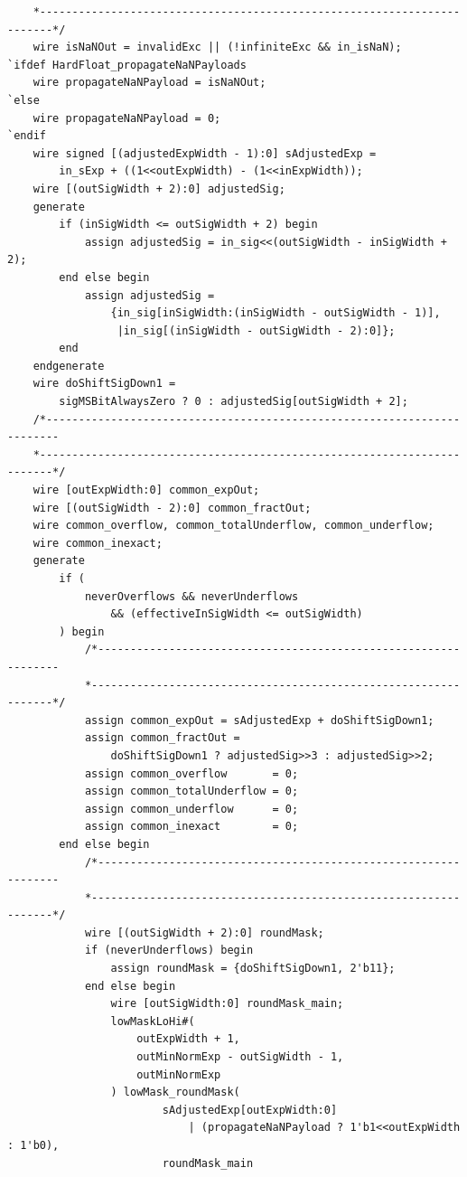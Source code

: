 \documentclass[12pt,letter]{article}
\begin{document}
\begin{lstlisting}
    *------------------------------------------------------------------------*/
    wire isNaNOut = invalidExc || (!infiniteExc && in_isNaN);
`ifdef HardFloat_propagateNaNPayloads
    wire propagateNaNPayload = isNaNOut;
`else
    wire propagateNaNPayload = 0;
`endif
    wire signed [(adjustedExpWidth - 1):0] sAdjustedExp =
        in_sExp + ((1<<outExpWidth) - (1<<inExpWidth));
    wire [(outSigWidth + 2):0] adjustedSig;
    generate
        if (inSigWidth <= outSigWidth + 2) begin
            assign adjustedSig = in_sig<<(outSigWidth - inSigWidth + 2);
        end else begin
            assign adjustedSig =
                {in_sig[inSigWidth:(inSigWidth - outSigWidth - 1)],
                 |in_sig[(inSigWidth - outSigWidth - 2):0]};
        end
    endgenerate
    wire doShiftSigDown1 =
        sigMSBitAlwaysZero ? 0 : adjustedSig[outSigWidth + 2];
    /*------------------------------------------------------------------------
    *------------------------------------------------------------------------*/
    wire [outExpWidth:0] common_expOut;
    wire [(outSigWidth - 2):0] common_fractOut;
    wire common_overflow, common_totalUnderflow, common_underflow;
    wire common_inexact;
    generate
        if (
            neverOverflows && neverUnderflows
                && (effectiveInSigWidth <= outSigWidth)
        ) begin
            /*----------------------------------------------------------------
            *----------------------------------------------------------------*/
            assign common_expOut = sAdjustedExp + doShiftSigDown1;
            assign common_fractOut =
                doShiftSigDown1 ? adjustedSig>>3 : adjustedSig>>2;
            assign common_overflow       = 0;
            assign common_totalUnderflow = 0;
            assign common_underflow      = 0;
            assign common_inexact        = 0;
        end else begin
            /*----------------------------------------------------------------
            *----------------------------------------------------------------*/
            wire [(outSigWidth + 2):0] roundMask;
            if (neverUnderflows) begin
                assign roundMask = {doShiftSigDown1, 2'b11};
            end else begin
                wire [outSigWidth:0] roundMask_main;
                lowMaskLoHi#(
                    outExpWidth + 1,
                    outMinNormExp - outSigWidth - 1,
                    outMinNormExp
                ) lowMask_roundMask(
                        sAdjustedExp[outExpWidth:0]
                            | (propagateNaNPayload ? 1'b1<<outExpWidth : 1'b0),
                        roundMask_main

\end{lstlisting}
\end{document}

